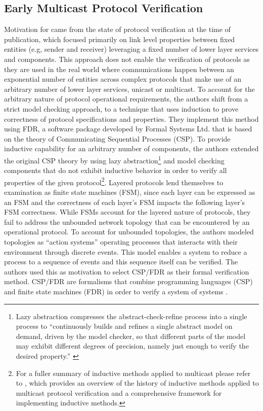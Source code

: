 \documentclass[10pt, journal]{IEEEtran}
\begin{document}
\subsection{Early Multicast Protocol Verification}
Motivation for \cite{Creese1999} came from the state of protocol verification at the time of publication, which focused primarily on link level properties between fixed entities (e.g, sender and receiver) leveraging a fixed number of lower layer services and components. This approach does not enable the verification of protocols as they are used in the real world where communications happen between an exponential number of entities across complex protocols that make use of an arbitrary number of lower layer services, unicast or multicast. 
\bigbreak
To account for the arbitrary nature of protocol operational requirements, the authors shift from a strict model checking approach, to a technique that uses induction to prove correctness of protocol specifications and properties. They implement this method using FDR, a software package developed by Formal Systems Ltd. that is based on the theory of Communicating Sequential Processes (CSP). To provide inductive capability for an arbitrary number of components, the authors extended the original CSP theory by using lazy abstraction\footnote{Lazy abstraction compresses the abstract-check-refine process into a single process to ``continuously builds and refines a single abstract model on demand, driven by the model checker, so that different parts of the model may exhibit different degrees of precision, namely just enough to verify the desired property.'' \cite{Henzinger2002}} and model checking components that do not exhibit inductive behavior in order to verify all properties of the given protocol\footnote{For a fuller summary of inductive methods applied to multicast please refer to \cite{Martina2015}, which provides an overview of the history of inductive methods applied to multicast protocol verification and a comprehensive framework for implementing inductive methods.}.
\bigbreak
Layered protocols lend themselves to examination as finite state machines (FSM), since each layer can be expressed as an FSM and the correctness of each layer's FSM impacts the following layer's FSM correctness. While FSMs account for the layered nature of protocols, they fail to address the unbounded network topology that can be encountered by an operational protocol. To account for unbounded topologies, the authors modeled topologies as ``action systems'' operating processes that interacts with their environment through discrete events. This model enables a system to reduce a process to a sequence of events and this sequence itself can be verified. The authors used this as motivation to select CSP/FDR as their formal verification method. CSP/FDR are formalisms that combine programming languages (CSP) and finite state machines (FDR) in order to verify a system of systems \cite{Henzinger2002}.
\end{document}

